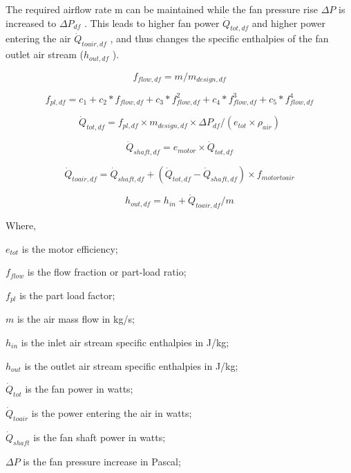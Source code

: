 The required airflow rate m can be maintained while the fan pressure rise \(\Delta P\) is increased to \(\Delta P_{df}\) . This leads to higher fan power \(\dot Q_{tot,df}\) and higher power entering the air \(\dot Q_{toair,df}\) , and thus changes the specific enthalpies of the fan outlet air stream (\(h_{out,df}\) ).

\begin{equation}
f_{flow,df} = m / m_{design,df}
\end{equation}

\begin{equation}
f_{pl,df} = c_{1} + c_{2}*f_{flow,df} + c_{3}*f_{flow,df}^2 + c_{4}*f_{flow,df}^3 + c_{5}*f_{flow,df}^4
\end{equation}

\begin{equation}
\dot{Q}_{tot,df} = f_{pl,df} \times m_{design,df} \times \Delta P_{df} / (e_{tot} \times \rho_{air} )
\end{equation}

\begin{equation}
\dot{Q}_{shaft,df} = e_{motor} \times \dot{Q}_{tot, df}
\end{equation}

\begin{equation}
\dot{Q}_{toair,df} = \dot{Q}_{shaft,df} +( \dot{Q}_{tot,df} - \dot{Q}_{shaft,df}) \times f_{motortoair}
\end{equation}

\begin{equation}
h_{out,df} = h_{in} + \dot{Q}_{toair,df} / m
\end{equation}

Where,

\(e_{tot}\) is the motor efficiency;

\(f_{flow}\) is the flow fraction or part-load ratio;

\(f_{pl}\) is the part load factor;

\(m\) is the air mass flow in kg/s;

\(h_{in}\) is the inlet air stream specific enthalpies in J/kg;

\(h_{out}\) is the outlet air stream specific enthalpies in J/kg;

\(\dot{Q}_{tot}\) is the fan power in watts;

\(\dot{Q}_{toair}\) is the power entering the air in watts;

\(\dot{Q}_{shaft}\) is the fan shaft power in watts;

\(\Delta P\) is the fan pressure increase in Pascal;

